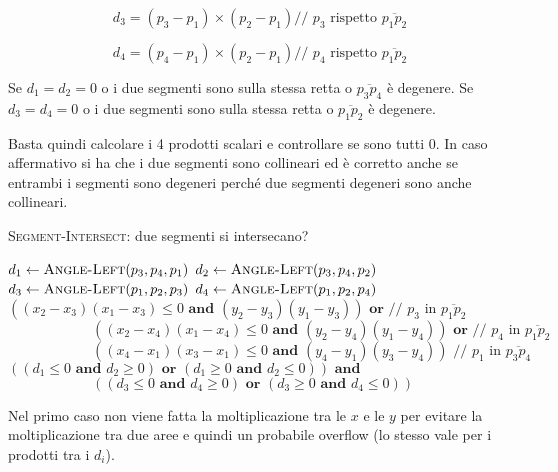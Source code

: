 $$
d_3 = (p_3-p_1) \times (p_2-p_1) \text{// } p_3\text{ rispetto } \overline{p_1p_2}
$$

$$
d_4 = (p_4-p_1) \times (p_2-p_1) \text{// } p_4\text{ rispetto } \overline{p_1p_2}
$$

Se $d_1 = d_2 = 0$ o i due segmenti sono sulla stessa retta o $\overline{p_3p_4}$ è degenere. 
Se $d_3=d_4=0$ o i due segmenti sono sulla stessa retta o $\overline{p_1p_2}$ è degenere.

Basta quindi calcolare i 4 prodotti scalari e controllare se sono tutti 0. In caso affermativo si ha che i due segmenti sono collineari ed è corretto anche se entrambi i segmenti sono degeneri perché due segmenti degeneri sono anche collineari.

\begin{breakablealgorithm}
	\caption{\textsc{Segment-Intersect}: due segmenti si intersecano?}
	\begin{algorithmic}[1]
		    \State $d_1 \gets \textsc{Angle-Left}(p_3,p_4,p_1)$
		    \State $d_2 \gets \textsc{Angle-Left}(p_3,p_4,p_2)$
		    \State $d_3 \gets \textsc{Angle-Left}(p_1,p_2,p_3)$
		    \State $d_4 \gets \textsc{Angle-Left}(p_1,p_2,p_4)$
		     
		        \State \Return $((x_2 - x_3)(x_1 - x_3) \leq 0 \textbf{ and } (y_2 - y_3)(y_1 - y_3)) \textbf{ or } \text{// }p_3 \text{ in } \overline{p_1p_2}$
		        \Statex $\qquad \qquad \qquad((x_2 - x_4)(x_1 - x_4) \leq 0 \textbf{ and } (y_2 - y_4)(y_1 - y_4)) \textbf{ or } \text{// }p_4 \text{ in } \overline{p_1p_2}$
		        \Statex $\qquad \qquad \qquad ((x_4 - x_1)(x_3 - x_1) \leq 0 \textbf{ and } (y_4 - y_1)(y_3 - y_4)) \text{ // }p_1 \text{ in } \overline{p_3p_4} $
		    \Else
				\State \Return $((d_1 \leq 0 \textbf{ and } d_2 \geq 0)\textbf{ or }(d_1 \geq 0\textbf{ and }d_2 \leq 0))\textbf{ and }$
		        \Statex $ \qquad \qquad \qquad((d_3 \leq 0 \textbf{ and } d_4 \geq 0)\textbf{ or } (d_3 \geq 0 \textbf{ and }d_4 \leq 0)) $
		    \EndIf
		\EndFunction
       	\end{algorithmic}
\end{breakablealgorithm}

Nel primo caso non viene fatta la moltiplicazione tra le $x$ e le $y$ per evitare la moltiplicazione tra due aree e quindi un probabile overflow (lo stesso vale per i prodotti tra i $d_i$).

